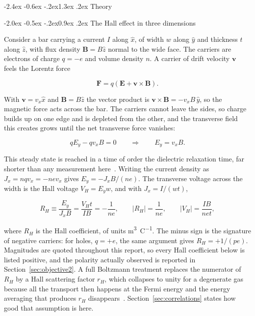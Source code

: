 \documentclass[11pt,a4paper]{article}
\makeatletter
\renewcommand\section{\@startsection{section}{1}{\z@}%
  {-2.4ex \@plus -0.6ex \@minus -.2ex}{1.3ex \@plus .2ex}%
  {\normalfont\large\bfseries}}
\renewcommand\subsection{\@startsection{subsection}{2}{\z@}%
  {-2.0ex \@plus -0.5ex \@minus -.2ex}{0.9ex \@plus .2ex}%
  {\normalfont\normalsize\bfseries}}
\makeatother
\begin{document}
\section{Theory}

\subsection{The Hall effect in three dimensions}
\label{sec:theory3d}

Consider a bar carrying a current $I$ along $\hat{x}$, of width $w$ along $\hat{y}$ and
thickness $t$ along $\hat{z}$, with flux density $\mathbf{B} = B\hat{z}$ normal to the wide
face. The carriers are electrons of charge $q=-e$ and volume density $n$. A carrier of drift
velocity $\mathbf{v}$ feels the Lorentz force

\begin{equation}
\mathbf{F} = q\left(\mathbf{E} + \mathbf{v}\times\mathbf{B}\right).
\label{eq:lorentz}
\end{equation}

With $\mathbf{v}=v_x\hat{x}$ and $\mathbf{B}=B\hat{z}$ the vector product is
$\mathbf{v}\times\mathbf{B} = -v_x B\,\hat{y}$, so the magnetic force acts across the bar.
The carriers cannot leave the sides, so charge builds up on one edge and is depleted from
the other, and the transverse field this creates grows until the net transverse force
vanishes:

\begin{equation}
q E_y - q v_x B = 0 \qquad \Longrightarrow \qquad E_y = v_x B .
\label{eq:steady}
\end{equation}

This steady state is reached in a time of order the dielectric relaxation time, far shorter
than any measurement here~\cite{ashcroft1976}. Writing the current density as
$J_x = nqv_x = -nev_x$ gives $E_y = -J_x B/(ne)$. The transverse voltage across the width is
the Hall voltage $V_H = E_y w$, and with $J_x = I/(wt)$,

\begin{equation}
R_H \equiv \frac{E_y}{J_x B} = \frac{V_H t}{IB} = -\frac{1}{ne},
\qquad
\left|R_H\right| = \frac{1}{ne},
\qquad
\left|V_H\right| = \frac{IB}{net},
\label{eq:rh3d}
\end{equation}

where $R_H$ is the Hall coefficient, of units \unit{\metre\cubed\per\coulomb}. The minus
sign is the signature of negative carriers: for holes, $q = +e$, the same argument gives
$R_H = +1/(pe)$. Magnitudes are quoted throughout this report, so every Hall coefficient
below is listed positive, and the polarity actually observed is reported in
Section~\ref{sec:objective2}. A full Boltzmann treatment replaces the numerator of $R_H$ by
a Hall scattering factor $r_H$, which collapses to unity for a degenerate gas because all the
transport then happens at the Fermi energy and the energy averaging that produces $r_H$
disappears~\cite{ashcroft1976}. Section~\ref{sec:correlations} states how good that
assumption is here.
\end{document}
